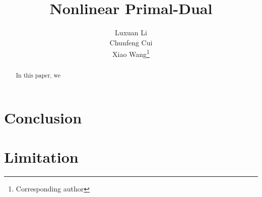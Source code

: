 \documentclass{article}
\title{Nonlinear Primal-Dual}
\author{%
  Luxuan Li \\
  \And
  Chunfeng Cui \\
  \And
  Xiao Wang\thanks{Corresponding author} \\
}
\begin{document}
\raggedbottom

\maketitle
\begin{abstract}
\vspace{-1.9mm}
In this paper, we 
\end{abstract}







\section{Conclusion}
\label{Section: Conclusion}

\section{Limitation}
\label{Section: limitation}

\clearpage
\small %

 
\end{document}
